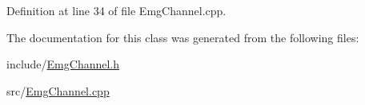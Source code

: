 Definition at line 34 of file Emg\+Channel.\+cpp.



The documentation for this class was generated from the following files\+:\begin{DoxyCompactItemize}
\item 
include/\hyperlink{_emg_channel_8h}{Emg\+Channel.\+h}\item 
src/\hyperlink{src_2_emg_channel_8cpp}{Emg\+Channel.\+cpp}\end{DoxyCompactItemize}
